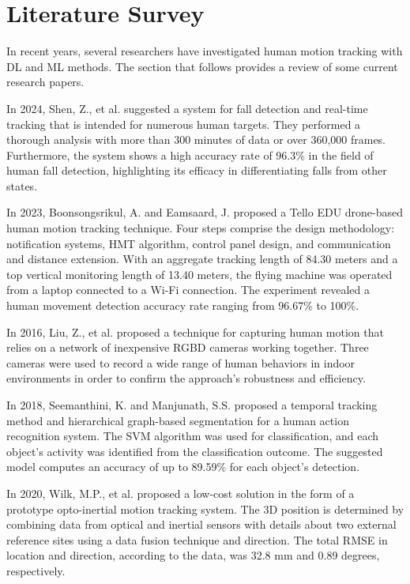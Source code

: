 \documentclass[conference]{IEEEtran}
\begin{document}
\section{Literature Survey}

In recent years, several researchers have investigated human motion tracking with DL and ML methods. The section that follows provides a review of some current research papers.

In 2024, Shen, Z., et al. \cite{b12} suggested a system for fall detection and real-time tracking that is intended for numerous human targets. They performed a thorough analysis with more than 300 minutes of data or over 360,000 frames. Furthermore, the system shows a high accuracy rate of 96.3\% in the field of human fall detection, highlighting its efficacy in differentiating falls from other states.

In 2023, Boonsongsrikul, A. and Eamsaard, J. \cite{b13} proposed a Tello EDU drone-based human motion tracking technique. Four steps comprise the design methodology: notification systems, HMT algorithm, control panel design, and communication and distance extension. With an aggregate tracking length of 84.30 meters and a top vertical monitoring length of 13.40 meters, the flying machine was operated from a laptop connected to a Wi-Fi connection. The experiment revealed a human movement detection accuracy rate ranging from 96.67\% to 100\%.

In 2016, Liu, Z., et al. \cite{b14} proposed a technique for capturing human motion that relies on a network of inexpensive RGBD cameras working together. Three cameras were used to record a wide range of human behaviors in indoor environments in order to confirm the approach's robustness and efficiency.

In 2018, Seemanthini, K. and Manjunath, S.S. \cite{b15} proposed a temporal tracking method and hierarchical graph-based segmentation for a human action recognition system. The SVM algorithm was used for classification, and each object's activity was identified from the classification outcome. The suggested model computes an accuracy of up to 89.59\% for each object's detection.

In 2020, Wilk, M.P., et al. \cite{b16} proposed a low-cost solution in the form of a prototype opto-inertial motion tracking system. The 3D position is determined by combining data from optical and inertial sensors with details about two external reference sites using a data fusion technique and direction. The total RMSE in location and direction, according to the data, was 32.8 mm and 0.89 degrees, respectively.
\end{document}
